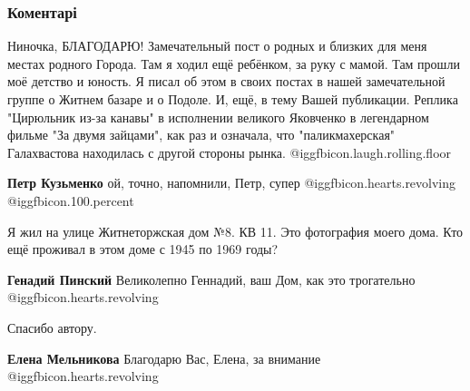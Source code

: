  
 
 
 
 
\subsubsection{Коментарі}

\begin{itemize} %

Ниночка, БЛАГОДАРЮ! Замечательный пост о родных и близких для меня местах
родного Города. Там я ходил ещё ребёнком, за руку с мамой. Там прошли моё
детство и юность. Я писал об этом в своих постах в нашей замечательной группе о
Житнем базаре и о Подоле. И, ещё, в тему Вашей публикации. Реплика "Цирюльник
из-за канавы" в исполнении великого Яковченко в легендарном фильме "За двумя
зайцами", как раз и означала, что "паликмахерская" Галахвастова находилась с
другой стороны рынка.  @igg{fbicon.laugh.rolling.floor} 

\begin{itemize} %
\textbf{Петр Кузьменко} ой, точно, напомнили, Петр, супер @igg{fbicon.hearts.revolving}  @igg{fbicon.100.percent} 
\end{itemize} %


Я жил на улице Житнеторжская дом №8. КВ 11. Это фотография моего дома. Кто ещё
проживал в этом доме с 1945 по 1969 годы?

\begin{itemize} %
\textbf{Генадий Пинский} Великолепно Геннадий, ваш Дом, как это трогательно @igg{fbicon.hearts.revolving} 
\end{itemize} %

Спасибо автору.

\begin{itemize} %
\textbf{Елена Мельникова} Благодарю Вас, Елена, за внимание @igg{fbicon.hearts.revolving} 
\end{itemize} %



\end{itemize}
